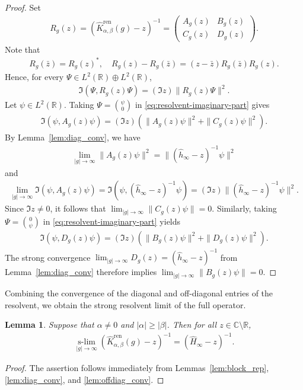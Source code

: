 \documentclass[12pt,dvipdfmx]{article}
\newtheorem{lemma}[theorem]{Lemma}
\newcommand{\RR}{\mathbb{R}}
\newcommand{\CC}{\mathbb{C}}
\begin{document}
\begin{proof}
Set
\begin{align*}
    R_g(z)
    =
    (\hat{K}_{\alpha,\beta}^{\mathrm{ren} }(g) - z)^{-1}
    =
    \begin{pmatrix}
        A_g(z) & B_g(z)\\
        C_g(z) & D_g(z)
    \end{pmatrix}.
\end{align*}
Note that
\begin{align*}
    R_g(\bar z) = R_g(z)^*,
    \quad
    R_g(z) - R_g(\bar z) = (z - \bar z) R_g(\bar z) R_g(z).
\end{align*}
Hence, for every $\Psi \in L^2(\RR) \oplus L^2(\RR)$,
\begin{align}\label{eq:resolvent-imaginary-part}
    \Im (\Psi, R_g(z)\Psi)
    =
    (\Im z) \| R_g(z)\Psi \|^2.
\end{align}
Let $\psi \in L^2(\RR)$. Taking $\Psi = \binom{\psi}{0}$ in \eqref{eq:resolvent-imaginary-part} gives
\begin{align*}
    \Im(\psi, A_g(z)\psi)
    =
    (\Im z)
    \left(
        \| A_g(z)\psi \|^2 + \| C_g(z)\psi \|^2
    \right).
\end{align*}
By Lemma~\ref{lem:diag_conv}, we have
\begin{align*}
    \lim_{|g|\to\infty} \| A_g(z)\psi \|^2
    =
    \| (\hat{h}_\infty - z)^{-1}\psi \|^2
\end{align*}
and
\begin{align*}
    \lim_{|g|\to\infty} \Im(\psi, A_g(z)\psi)
    =
    \Im\left(\psi, (\hat{h}_\infty - z)^{-1}\psi\right)
    =
    (\Im z) \| (\hat{h}_\infty - z)^{-1}\psi \|^2.
\end{align*}
Since $\Im z\ne0$, it follows that $\lim_{|g|\to\infty}\|C_g(z)\psi\| = 0$.
Similarly, taking $\Psi = \binom{0}{\psi}$ in \eqref{eq:resolvent-imaginary-part} yields
\begin{align*}
    \Im(\psi, D_g(z)\psi)
    =
    (\Im z)
    \left(
        \| B_g(z)\psi \|^2 + \| D_g(z)\psi \|^2
    \right).
\end{align*}
The strong convergence $\lim_{|g|\to\infty}D_g(z) = (\hat{h}_\infty - z)^{-1}$ from Lemma~\ref{lem:diag_conv} therefore implies $\lim_{|g|\to\infty}\|B_g(z)\psi\| = 0$.
\end{proof}
%
Combining the convergence of the diagonal and off-diagonal entries of the resolvent, we obtain the strong resolvent limit of the full operator. 
\begin{lemma}\label{prop:strong_resolvent_conv}
Suppose that $\alpha\ne0$ and $|\alpha|\ge|\beta|$. Then for all $z\in\CC\setminus\RR$, 
\begin{align*}
\operatorname*{s-lim}_{|g|\to\infty}
    (\hat{K}_{\alpha,\beta}^{\mathrm{ren} }(g) - z)^{-1}
    =
    (\hat{H}_\infty - z)^{-1}.
\end{align*}
\end{lemma}
%
\begin{proof}
The assertion follows immediately from Lemmas~\ref{lem:block_rep}, \ref{lem:diag_conv}, and \ref{lem:offdiag_conv}.
\end{proof}
%
%
\end{document}
